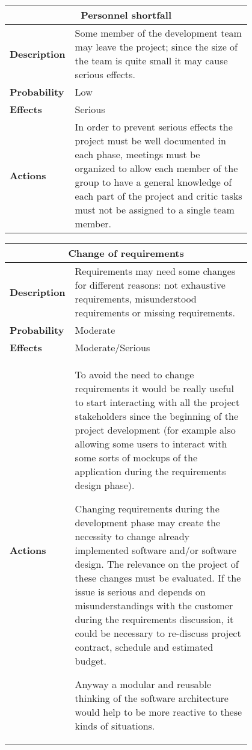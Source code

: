 \begin{longtable}{lp{0.8\linewidth}}
\multicolumn{2}{c}{\textbf{Personnel shortfall}}\\
\toprule
\textbf{Description}& Some member of the development team may leave the project; since the size of the team is quite small it may cause serious effects. \\
\midrule
\textbf{Probability}&Low\\
\midrule
\textbf{Effects}&Serious\\
\midrule
\textbf{Actions}& In order to prevent serious effects the project must be well documented in each phase, meetings must be organized to allow each member of the group to have a general knowledge of each part of the project and critic tasks must not be assigned to a single team member.\\
\bottomrule
\end{longtable}

\begin{longtable}{lp{0.8\linewidth}}
\multicolumn{2}{c}{\textbf{Change of requirements}}\\
\toprule
\textbf{Description}& Requirements may need some changes for different reasons: not exhaustive requirements, misunderstood requirements or missing requirements. \\
\midrule
\textbf{Probability}&Moderate\\
\midrule
\textbf{Effects}&Moderate/Serious\\
\midrule
\textbf{Actions}& To avoid the need to change requirements it would be really useful to start interacting with all the project stakeholders since the beginning of the project development (for example also allowing some users to interact with some sorts of mockups of the application during the requirements design phase). 

Changing requirements during the development phase may create the necessity to change already implemented software and/or software design. The relevance on the project of these changes must be evaluated. If the issue is serious and depends on misunderstandings with the customer during the requirements discussion, it could be necessary to re-discuss project contract, schedule and estimated budget. 

Anyway a modular and reusable thinking of the software architecture would help to be more reactive to these kinds of situations.\\
\bottomrule
\end{longtable}

